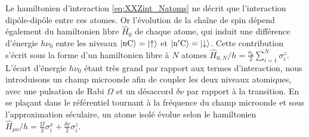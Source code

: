 Le hamiltonien d'interaction \eqref{eq:XXZint_Natoms} ne décrit que l'interaction dipôle-dipôle entre ces atomes.
Or l'évolution de la chaîne de spin dépend également du hamiltonien libre $\hat{H}_0$ de chaque atome, qui induit une différence d'énergie $h\nu_0$ entre les niveaux $\ket{\mathrm{nC}}=\ket{\uparrow}$ et $\ket{\mathrm{n'C}}=\ket{\downarrow}$.
Cette contribution s'écrit sous la forme d'un hamiltonien libre à $N$ atomes $\hat{H}_{0,N}/h = \frac{\nu_0}{2} \sum_{i=1}^{N}\sigma_i^z$.
L'écart d'énergie $h\nu_0$ étant très grand par rapport aux termes d'interaction, nous introduisons 
un champ microonde afin de coupler les deux niveaux atomiques, 
avec une pulsation de Rabi $\Omega$ et un désaccord $\delta\nu$ par rapport à la transition.
En se plaçant dans le référentiel tournant à la fréquence du champ microonde et sous l'approximation séculaire, un atome isolé évolue selon le hamiltonien 
$\hat{H}_{\mu o}/h = \frac{\Omega}{2}\sigma_i^x + \frac{\delta\nu}{2} \sigma_i^z$.

